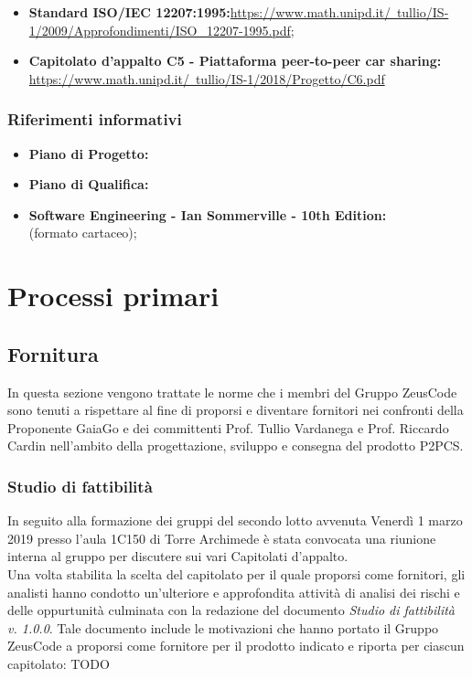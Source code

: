 \documentclass[a4paper]{article}
\newcommand{\GroupName} {Gruppo ZeusCode }
\begin{document}
\begin{itemize}
	\item  \textbf{Standard ISO/IEC 12207:1995:}\href{https://www.math.unipd.it/~tullio/IS-1/2009/Approfondimenti/ISO_12207-1995.pdf}{https://www.math.unipd.it/~tullio/IS-1/2009/Approfondimenti/ISO_12207-1995.pdf};
	\item \textbf{Capitolato d'appalto C5 - Piattaforma peer-to-peer car sharing:} \href{https://www.math.unipd.it/~tullio/IS- 1/2018/Progetto/C6.pdf}{https://www.math.unipd.it/~tullio/IS-1/2018/Progetto/C6.pdf}
\end{itemize}

\subsubsection {Riferimenti informativi}
\begin{itemize}
	\item \textbf{Piano di Progetto:}
	\item \textbf{Piano di Qualifica:}
	\item \textbf{Software Engineering - Ian Sommerville - 10th Edition: \\}(formato cartaceo);
\end{itemize}
\section {Processi primari}
	\subsection {Fornitura}
	In questa sezione vengono trattate le norme che i membri del \GroupName sono tenuti a rispettare al fine di proporsi e diventare fornitori nei confronti della Proponente GaiaGo e dei committenti Prof. Tullio Vardanega e Prof. Riccardo Cardin nell'ambito della progettazione, sviluppo e consegna del prodotto P2PCS.
		\subsubsection {Studio di fattibilità}
		In seguito alla formazione dei gruppi del secondo lotto avvenuta Venerdì 1 marzo 2019 presso l'aula 1C150 di Torre Archimede è stata convocata una riunione interna al gruppo per discutere sui vari Capitolati d'appalto. \\ Una volta stabilita la scelta del capitolato per il quale proporsi come fornitori, gli analisti hanno condotto un'ulteriore e approfondita attività di analisi dei rischi e delle oppurtunità culminata con la redazione del documento \textit{Studio di fattibilità v. 1.0.0}. Tale documento include le motivazioni che hanno portato il \GroupName a proporsi come fornitore per il prodotto indicato e riporta per ciascun capitolato: TODO
\end{document}
